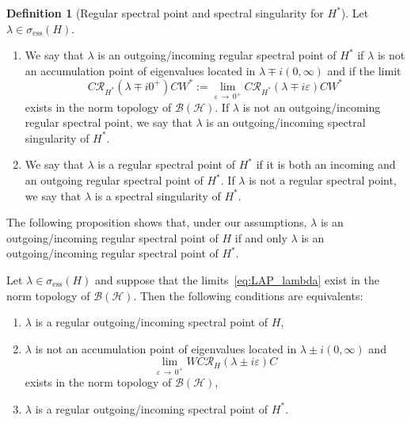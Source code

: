 \documentclass[10pt]{amsart}
\theoremstyle{definition}\newtheorem{defi}[theo]{Definition}\newtheorem{rema}[theo]{Remark}\newtheorem{exam}[theo]{Example}\newtheorem{exem}[theo]{Example}\newtheorem{nota}[theo]{Notation}
\newcommand{\Hi}{\mathcal{H}}
\newcommand{\ess}{\mathrm{ess}}
\newcommand{\Res}{\mathcal{R}}
\newcommand{\clB}{\mathcal{B}}
\newcommand*{\romanenumi}{\renewcommand*{\theenumi}{\roman{enumi}}}
\begin{document}
\begin{defi}[Regular spectral point and spectral singularity for $H^*$]\label{def:point_spectral_regulier_classique_pour_H_star}
Let $\lambda\in\sigma_\ess(H)$.
\begin{enumerate}\romanenumi
\item\label{defi4.4.1} We say that $\lambda$ is an outgoing/incoming regular spectral point of $H^*$ if $\lambda$ is not an accumulation point of eigenvalues located in $\lambda\mp i\left(0,\infty\right)$ and if the limit
\begin{equation}\label{eq:def_reg_spec_pt_H_Star}
C\Res_{H^*}(\lambda\mp i0^+)CW^*:=\lim_{\varepsilon\,\rightarrow\,0^+} C\Res_{H^*}(\lambda\mp i\varepsilon)CW^*
\end{equation}
exists in the norm topology of $\clB(\Hi)$. If $\lambda$ is not an outgoing/incoming regular spectral point, we say that $\lambda$ is an outgoing/incoming spectral singularity of $H^*$.
\item\label{defi4.4.2} We say that $\lambda$ is a regular spectral point of $H^*$ if it is both an incoming and an outgoing regular spectral point of $H^*$. If $\lambda$ is not a regular spectral point, we say that $\lambda$ is a spectral singularity of $H^*$.
\end{enumerate}
\end{defi}

The following proposition shows that, under our assumptions, $\lambda$ is an outgoing/incoming regular spectral point of $H$ if and only $\lambda$ is an outgoing/incoming regular spectral point of $H^*$.

\begin{prop}
Let $\lambda\in\sigma_\ess(H)$ and suppose that the limits~\eqref{eq:LAP_lambda} exist in the norm topology of $\clB(\Hi)$. Then the following conditions are equivalents:
\begin{enumerate}\romanenumi
\item\label{it:a1}
$\lambda$ is a regular outgoing/incoming spectral point of $H$,
\item\label{it:a2}
$\lambda$ is not an accumulation point of eigenvalues located in $\lambda \pm i(0,\infty)$ and
\begin{equation*}
\lim_{\varepsilon\,\rightarrow\,0^+} WC\Res_H(\lambda\pm i\varepsilon)C
\end{equation*}
exists in the norm topology of $\clB(\Hi)$,
\item\label{it:a3}
$\lambda$ is a regular outgoing/incoming spectral point of $H^*$.
\end{enumerate}
\end{prop}
\end{document}
